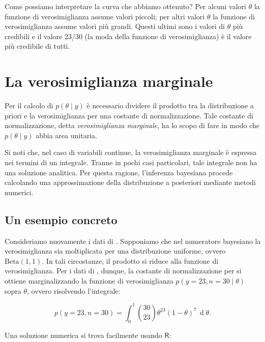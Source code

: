 \documentclass[
  11pt,
]{krantz}
\newcommand{\R}{\textsf{R}} %
\theoremstyle{definition}
\theoremstyle{definition}
\theoremstyle{definition}
\theoremstyle{definition}
\theoremstyle{remark}
\begin{document}
Come possiamo interpretare la curva che abbiamo ottenuto? Per alcuni valori \(\theta\) la funzione di verosimiglianza assume valori piccoli; per altri valori \(\theta\) la funzione di verosimiglianza assume valori più grandi. Questi ultimi sono i valori di \(\theta\) più credibili e il valore 23/30 (la moda della funzione di verosimiglianza) è il valore più credibile di tutti.

\hypertarget{sec:const-normaliz-bino23}{%
\section{La verosimiglianza marginale}\label{sec:const-normaliz-bino23}}

Per il calcolo di \(p(\theta \mid y)\) è necessario dividere il prodotto tra la distribuzione a priori e la verosimiglianza per una costante di normalizzazione. Tale costante di normalizzazione, detta \emph{verosimiglianza marginale}, ha lo scopo di fare in modo che \(p(\theta \mid y)\) abbia area unitaria.

Si noti che, nel caso di variabili continue, la verosimiglianza marginale è espressa nei termini di un integrale. Tranne in pochi casi particolari, tale integrale non ha una soluzione analitica. Per questa ragione, l'inferenza bayesiana procede calcolando una approssimazione della distribuzione a posteriori mediante metodi numerici.

\hypertarget{un-esempio-concreto-2}{%
\subsection{Un esempio concreto}\label{un-esempio-concreto-2}}

Consideriamo nuovamente i dati di \citet{zetschefuture2019}. Supponiamo che nel numeratore bayesiano la verosimiglianza sia moltiplicata per una distribuzione uniforme, ovvero \(\mbox{Beta}(1, 1)\). In tali circostanze, il prodotto si riduce alla funzione di verosimiglianza. Per i dati di \citet{zetschefuture2019}, dunque, la costante di normalizzazione per si ottiene marginalizzando la funzione di verosimiglianza \(p(y = 23, n = 30 \mid \theta)\) sopra \(\theta\), ovvero risolvendo l'integrale:

\begin{equation}
p(y = 23, n = 30) = \int_0^1 \binom{30}{23} \theta^{23} (1-\theta)^{7} \,\operatorname {d}\!\theta.
\label{eq:intlikebino23}
\end{equation}

Una soluzione numerica si trova facilmente usando \(\R\):
\end{document}
